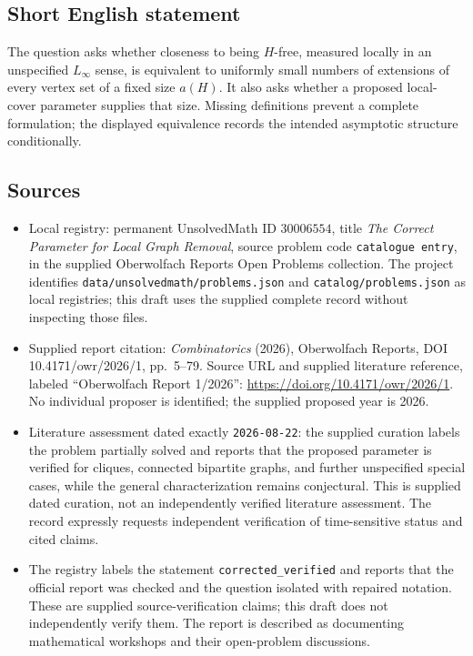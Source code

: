 \documentclass[11pt]{article}
\begin{document}
\subsection{Short English statement}
The question asks whether closeness to being \(H\)-free, measured locally in an unspecified \(L_\infty\) sense, is equivalent to uniformly small numbers of extensions of every vertex set of a fixed size \(a(H)\). It also asks whether a proposed local-cover parameter supplies that size. Missing definitions prevent a complete formulation; the displayed equivalence records the intended asymptotic structure conditionally.
\subsection{Sources}
\begin{itemize}
\item Local registry: permanent UnsolvedMath ID \(30006554\), title \emph{The Correct Parameter for Local Graph Removal}, source problem code \texttt{catalogue entry}, in the supplied Oberwolfach Reports Open Problems collection. The project identifies \texttt{data/unsolvedmath/problems.json} and \texttt{catalog/problems.json} as local registries; this draft uses the supplied complete record without inspecting those files.
\item Supplied report citation: \emph{Combinatorics} (2026), Oberwolfach Reports, DOI 10.4171/owr/2026/1, pp.\ 5--79. Source URL and supplied literature reference, labeled ``Oberwolfach Report 1/2026'': \url{https://doi.org/10.4171/owr/2026/1}. No individual proposer is identified; the supplied proposed year is 2026.
\item Literature assessment dated exactly \texttt{2026-08-22}: the supplied curation labels the problem partially solved and reports that the proposed parameter is verified for cliques, connected bipartite graphs, and further unspecified special cases, while the general characterization remains conjectural. This is supplied dated curation, not an independently verified literature assessment. The record expressly requests independent verification of time-sensitive status and cited claims.
\item The registry labels the statement \texttt{corrected\_verified} and reports that the official report was checked and the question isolated with repaired notation. These are supplied source-verification claims; this draft does not independently verify them. The report is described as documenting mathematical workshops and their open-problem discussions.
\end{itemize}
\end{document}
